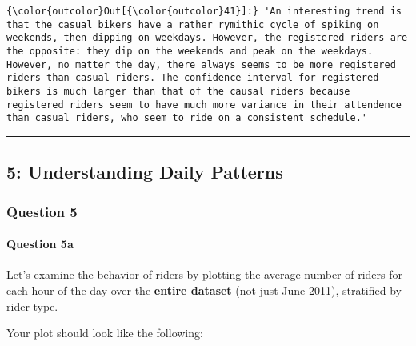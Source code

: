 \documentclass[11pt]{article}
\begin{document}
\begin{Verbatim}[commandchars=\\\{\}]
{\color{outcolor}Out[{\color{outcolor}41}]:} 'An interesting trend is that the casual bikers have a rather rymithic cycle of spiking on weekends, then dipping on weekdays. However, the registered riders are the opposite: they dip on the weekends and peak on the weekdays. However, no matter the day, there always seems to be more registered riders than casual riders. The confidence interval for registered bikers is much larger than that of the causal riders because registered riders seem to have much more variance in their attendence than casual riders, who seem to ride on a consistent schedule.'
\end{Verbatim}
            
    \begin{center}\rule{0.5\linewidth}{\linethickness}\end{center}

\subsection{5: Understanding Daily
Patterns}\label{understanding-daily-patterns}

\subsubsection{Question 5}\label{question-5}

\paragraph{Question 5a}\label{question-5a}

Let's examine the behavior of riders by plotting the average number of
riders for each hour of the day over the \textbf{entire dataset} (not
just June 2011), stratified by rider type.

Your plot should look like the following:
\end{document}
